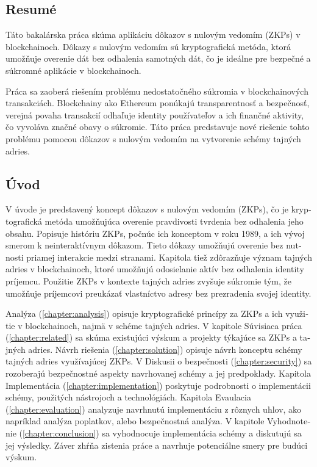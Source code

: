 \thispagestyle{empty}

\begin{otherlanguage}{slovak}
\chapter*{Resumé}

Táto bakalárska práca skúma aplikáciu dôkazov s nulovým vedomím (ZKPs) v
blockchainoch. Dôkazy s nulovým vedomím sú kryptografická metóda, ktorá
umožňuje overenie dát bez odhalenia samotných dát, čo je ideálne pre
bezpečné a súkromné aplikácie v blockchainoch.

Práca sa zaoberá riešením problému nedostatočného súkromia v
blockchainových transakciách. Blockchainy ako Ethereum ponúkajú
transparentnosť a bezpečnosť, verejná povaha transakcií odhaľuje identity
používateľov a ich finančné aktivity, čo vyvoláva značné obavy o súkromie.
Táto práca predstavuje nové riešenie tohto problému pomocou dôkazov s
nulovým vedomím na vytvorenie schémy tajných adries.

\section{Úvod}

V úvode  je predstavený koncept dôkazov s nulovým vedomím (ZKPs), čo je
kryptografická metóda umožňujúca overenie pravdivosti tvrdenia bez
odhalenia jeho obsahu. Popisuje históriu ZKPs, počnúc ich konceptom v roku
1989, a ich vývoj smerom k neinteraktívnym dôkazom. Tieto dôkazy umožňujú
overenie bez nutnosti priamej interakcie medzi stranami. Kapitola tiež
zdôrazňuje význam tajných adries v blockchainoch, ktoré umožňujú
odosielanie aktív bez odhalenia identity príjemcu. Použitie ZKPs v
kontexte tajných adries zvyšuje súkromie tým, že umožňuje príjemcovi
preukázať vlastníctvo adresy bez prezradenia svojej identity.

Analýza (\ref{chapter:analysis}) opisuje kryptografické princípy za ZKPs a
ich využitie v blockchainoch, najmä v schéme tajných adries. V kapitole
Súvisiaca práca (\ref{chapter:related}) sa skúma existujúci výskum a projekty
týkajúce sa ZKPs a tajných adries. Návrh riešenia (\ref{chapter:solution}) opisuje návrh
konceptu schémy tajných adries využívajúcej ZKPs. V Diskusii o
bezpečnosti (\ref{chapter:security}) sa rozoberajú bezpečnostné aspekty navrhovanej schémy a jej
predpoklady. Kapitola Implementácia (\ref{chapter:implementation}) poskytuje podrobnosti o implementácii
schémy, použitých nástrojoch a technológiách. Kapitola Evaulacia (\ref{chapter:evaluation}) analyzuje
navrhnutú implementáciu z rôznych uhlov, ako napríklad analýza poplatkov, alebo
bezpečnostná analýza.
V kapitole Vyhodnotenie (\ref{chapter:conclusion}) sa
vyhodnocuje implementácia schémy a diskutujú sa jej výsledky. Záver zhŕňa
zistenia práce a navrhuje potenciálne smery pre budúci výskum.


\end{otherlanguage}
